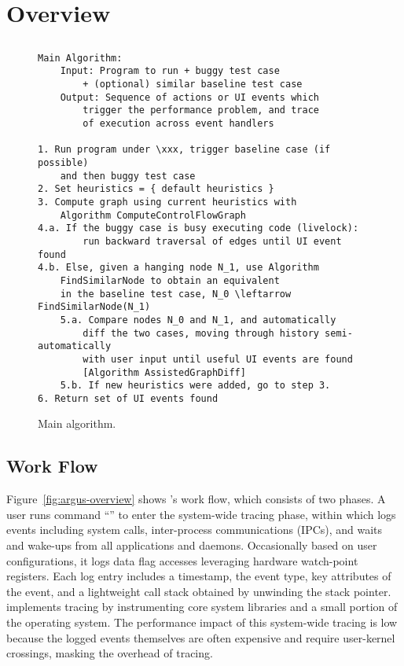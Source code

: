 \section{Overview} \label{sec:overview}

\subsection{\xxx}

\begin{figure}[tb]
    \centering
\begin{verbatim}
Main Algorithm:
    Input: Program to run + buggy test case
        + (optional) similar baseline test case
    Output: Sequence of actions or UI events which
        trigger the performance problem, and trace
        of execution across event handlers

1. Run program under \xxx, trigger baseline case (if possible)
    and then buggy test case
2. Set heuristics = { default heuristics }
3. Compute graph using current heuristics with
    Algorithm ComputeControlFlowGraph
4.a. If the buggy case is busy executing code (livelock):
        run backward traversal of edges until UI event found
4.b. Else, given a hanging node N_1, use Algorithm
    FindSimilarNode to obtain an equivalent
    in the baseline test case, N_0 \leftarrow FindSimilarNode(N_1)
    5.a. Compare nodes N_0 and N_1, and automatically
        diff the two cases, moving through history semi-automatically
        with user input until useful UI events are found
        [Algorithm AssistedGraphDiff]
    5.b. If new heuristics were added, go to step 3.
6. Return set of UI events found
\end{verbatim}
    \caption{Main \xxx algorithm.}
    \label{fig:alg-main}
\end{figure}

\subsection{\xxx Work Flow}

\begin{figure*}[tb]
    \centering
	
    \caption{\xxx Work Flow}
    \label{fig:argus-overview}
\end{figure*}

Figure~\ref{fig:argus-overview} shows \xxx's work flow, which consists of two
phases.  A user runs command ``'' to enter the system-wide
tracing phase, within which \xxx logs events including system calls,
inter-process communications (IPCs), and waits and wake-ups from all
applications and daemons.  Occasionally based on user configurations, it logs
data flag accesses leveraging hardware watch-point registers.  Each log entry
includes a timestamp, the event type, key attributes of the event, and a
lightweight call stack obtained by unwinding the stack pointer.  \xxx
implements tracing by instrumenting core system libraries and a small portion
of the operating system.  The performance impact of this system-wide tracing is
low because the logged events themselves are often expensive and require
user-kernel crossings, masking the overhead of tracing.

